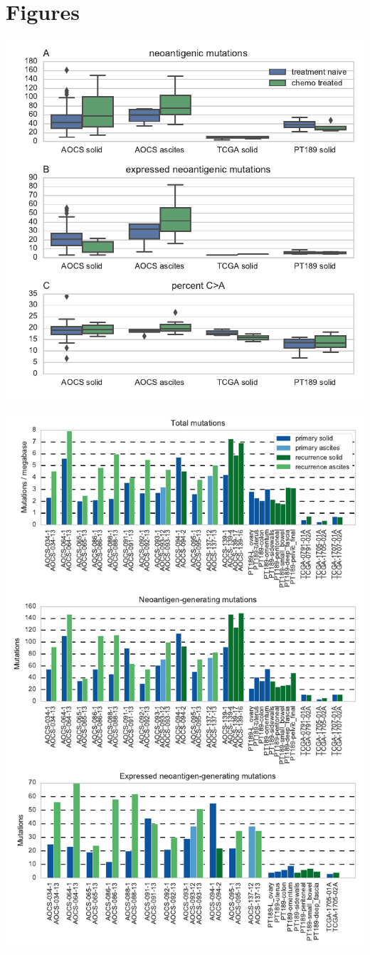 \section{Figures}
\includegraphics{figures/unpaired.pdf}

\includegraphics{figures/paired_counts.pdf}

